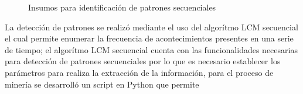 \begin{figure}[tb]
  \centering
  \caption{Insumos para identificación de patrones secuenciales}
  \label{fig:insumos}
\end{figure}
\newpage
La detección de patrones se realizó mediante el uso del algorítmo LCM secuencial\cite{uno2005lcm} el cual permite enumerar la frecuencia de acontecimientos 
presentes en una serie de tiempo; el algorítmo LCM secuencial cuenta con las funcionalidades necesarias para detección de patrones secuenciales por lo que 
es necesario establecer los parámetros para realiza la extracción de la información, para el proceso de minería se desarrolló un script en Python que permite 
